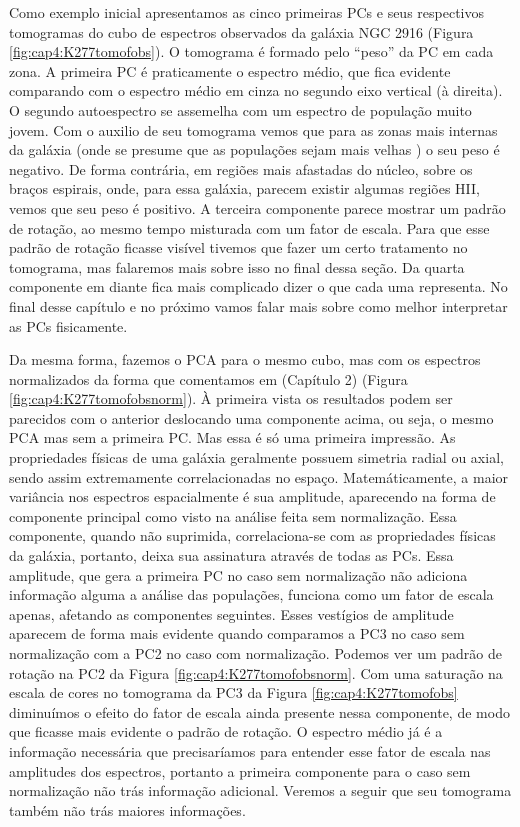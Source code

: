 Como exemplo inicial apresentamos as cinco primeiras PCs e seus respectivos tomogramas do cubo de espectros observados
da galáxia NGC 2916 (Figura \ref{fig:cap4:K277tomofobs}). O tomograma é formado pelo ``peso'' da PC em cada zona. A
primeira PC é praticamente o espectro médio, que fica evidente comparando com o espectro médio em cinza no segundo eixo
vertical (à direita). O segundo autoespectro se assemelha com um espectro de população muito jovem. Com o auxilio de seu
tomograma vemos que para as zonas mais internas da galáxia (onde se presume que as populações sejam mais velhas
\citneed) o seu peso é negativo. De forma contrária, em regiões mais afastadas do núcleo, sobre os braços espirais,
onde, para essa galáxia, parecem existir algumas regiões HII, vemos que seu peso é positivo. A terceira componente
parece mostrar um padrão de rotação, ao mesmo tempo misturada com um fator de escala. Para que esse padrão de rotação
ficasse visível tivemos que fazer um certo tratamento no tomograma, mas falaremos mais sobre isso no final dessa seção.
Da quarta componente em diante fica mais complicado dizer o que cada uma representa. No final desse capítulo e no
próximo vamos falar mais sobre como melhor interpretar as PCs fisicamente.

Da mesma forma, fazemos o PCA para o mesmo cubo, mas com os espectros normalizados da forma que comentamos em \fixme
(Capítulo 2) (Figura \ref{fig:cap4:K277tomofobsnorm}). À primeira vista os resultados podem ser parecidos com o anterior
deslocando uma componente acima, ou seja, o mesmo PCA mas sem a primeira PC. Mas essa é só uma primeira impressão. As
propriedades físicas de uma galáxia geralmente possuem simetria radial ou axial, sendo assim extremamente
correlacionadas no espaço. Matemáticamente, a maior variância nos espectros espacialmente é sua amplitude, aparecendo na
forma de componente principal como visto na análise feita sem normalização. Essa componente, quando não suprimida,
correlaciona-se com as propriedades físicas da galáxia, portanto, deixa sua assinatura através de todas as PCs. Essa
amplitude, que gera a primeira PC no caso sem normalização não adiciona informação alguma a análise das populações,
funciona como um fator de escala apenas, afetando as componentes seguintes. Esses vestígios de amplitude aparecem de
forma mais evidente quando comparamos a PC3 no caso sem normalização com a PC2 no caso com normalização. Podemos ver um
padrão de rotação na PC2 da Figura \ref{fig:cap4:K277tomofobsnorm}. Com uma saturação na escala de cores no tomograma da
PC3 da Figura \ref{fig:cap4:K277tomofobs} diminuímos o efeito do fator de escala ainda presente nessa componente, de
modo que ficasse mais evidente o padrão de rotação. O espectro médio já é a informação necessária que precisaríamos para
entender esse fator de escala nas amplitudes dos espectros, portanto a primeira componente para o caso sem normalização
não trás informação adicional. Veremos a seguir que seu tomograma também não trás maiores informações.

